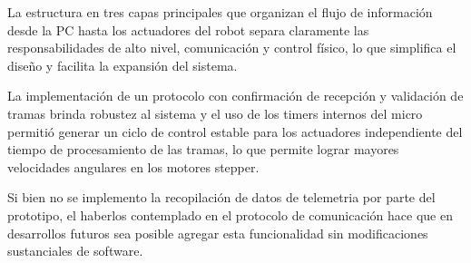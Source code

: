 La estructura en tres capas principales que organizan el flujo de información desde la PC hasta los actuadores del robot separa claramente las responsabilidades de alto nivel, comunicación y control físico, lo que simplifica el diseño y facilita la expansión del sistema.

La implementación de un protocolo con confirmación de recepción y validación de tramas brinda robustez al sistema y el uso de los timers internos del micro permitió generar un ciclo de control estable para los actuadores independiente del tiempo de procesamiento de las tramas, lo que permite lograr mayores velocidades angulares en los motores stepper.

Si bien no se implemento la recopilación de datos de telemetria por parte del prototipo, el haberlos contemplado en el protocolo de comunicación hace que en desarrollos futuros sea posible agregar esta funcionalidad sin modificaciones sustanciales de software.



